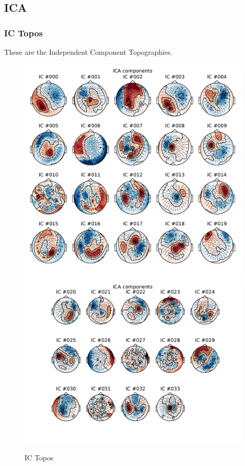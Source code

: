 \documentclass[english]{article}
\begin{document}
\subsection{ICA}
\subsubsection{IC Topos}
These are the Independent Component Topographies.
\begin{figure}[H]
\begin{centering}
\includegraphics[scale=0.5]{ica-0}
\includegraphics[scale=0.60]{ica-1}
\par\end{centering}
\caption{\label{fig:ica-topo} IC Topos}
\end{figure}
\end{document}
